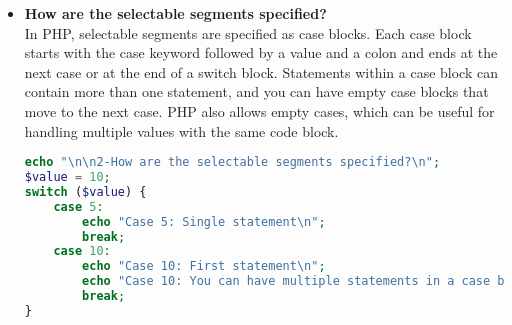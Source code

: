 \documentclass{article}
\begin{document}
\begin{itemize}
\begin{lstlisting}[language=PHP]
    switch ($type) {
        case "integer":
            echo "Control expression is an integer\n";
            break;
        case "string":
            echo "Control expression is a string\n";
            break;
        case "array":
            if (count($item) == 2 && isset($item[0]) && isset($item[1]) && !isset($item[2])) {
                echo "Control expression is an array length 2\n";
            } elseif (isset($item["key"])) {
                echo "Control expression is an associative array\n";
            } else {
                echo "Control expression is a sequential array\n";
            }
            break;
        case "boolean":
            echo "Control expression is a boolean\n";
            break;
        case "NULL":
            echo "Control expression is NULL\n";
            break;
        case "object":
            if ($item instanceof Obj && $item->x == 3) {
                echo "Control expression is an Obj with x = 3\n";
            } else {
                echo "Control expression is an object\n";
            }
            break;
        default:
            echo "No match found\n";
    }
}
\end{lstlisting}
\textbf{Printed Output:} 
\begin{verbatim}
1-What is the form and type of the control expression?Control expression is an integer with value 5
Control expression is an expression resulting in 7
Control expression is a literal
Control expression is a string 'hello'
Object has x = 4
Value: 1, Type: integer		Control expression is an integer
Value: apple, Type: string		Control expression is a string
Value: [3,4], Type: array		Control expression is an array length 2
Value: [1,2,3], Type: array		Control expression is a sequential array
Value: {"key":1}, Type: array		Control expression is an associative array
Value: 1, Type: boolean		Control expression is a boolean
Value: NULL, Type: NULL		Control expression is NULL
Value: Object, Type: object		Control expression is an Obj with x = 3
\end{verbatim}




\item \textbf{How are the selectable segments specified?} \\
In PHP, selectable segments are specified as case blocks. Each case block starts with the case keyword followed by a value and a colon and ends at the next case or at the end of a switch block. Statements within a case block can contain more than one statement, and you can have empty case blocks that move to the next case. PHP also allows empty cases, which can be useful for handling multiple values with the same code block.
\begin{lstlisting}[language=PHP]
echo "\n\n2-How are the selectable segments specified?\n";
$value = 10;
switch ($value) {
    case 5:
        echo "Case 5: Single statement\n";
        break;
    case 10:
        echo "Case 10: First statement\n";
        echo "Case 10: You can have multiple statements in a case block\n";
        break;
}


\end{lstlisting}
\end{itemize}
\end{document}
